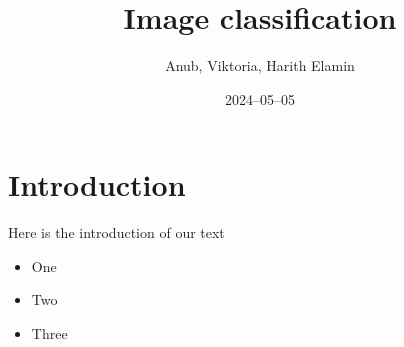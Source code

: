 \documentclass[12pt]{article}
\title{Image classification}
\author{Anub, Viktoria, Harith Elamin}
\date{2024–05–05}
\begin{document}
\maketitle

\section{Introduction}

Here is the introduction of our text

\begin{itemize}

\item One

\item Two

\item Three

\end{itemize}
\end{document}
